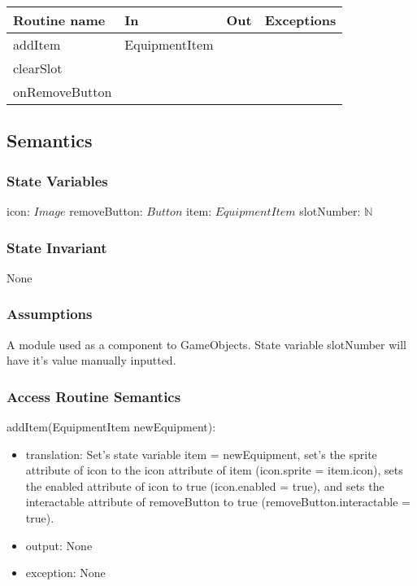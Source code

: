 \documentclass[12pt]{article}
\begin{document}
\begin{tabular}{| l | l | l | l |}
\hline
\textbf{Routine name} & \textbf{In} & \textbf{Out} & \textbf{Exceptions}\\
\hline
addItem & EquipmentItem & ~  & ~\\
clearSlot & ~ & ~ & ~\\
onRemoveButton & ~ & ~ & ~\\
\hline
\end{tabular}

\subsection* {Semantics}

\subsubsection* {State Variables}

icon: $Image$
removeButton: $Button$
item: $EquipmentItem$
slotNumber: $\mathbb{N}$

\subsubsection* {State Invariant}

None

\subsubsection* {Assumptions}

A module used as a component to GameObjects. State variable slotNumber will have it's value manually inputted.

\subsubsection* {Access Routine Semantics}

\noindent addItem(EquipmentItem newEquipment):
\begin{itemize}
\item translation: Set's state variable item = newEquipment, set's the sprite attribute of icon to the icon attribute of item (icon.sprite = item.icon), sets the enabled attribute of icon to true (icon.enabled = true), and sets the interactable attribute of removeButton to true (removeButton.interactable = true).
\item output: None
\item exception: None
\end{itemize}
\end{document}
